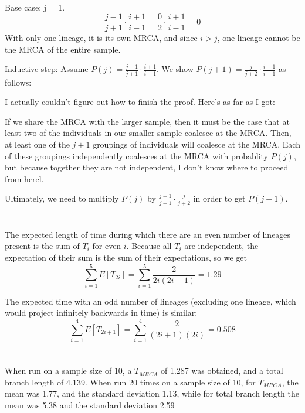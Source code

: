 \documentclass{article}
\begin{document}
\subsection{}
Base case:  j = 1.  $$\frac{j - 1}{j + 1} \cdot \frac{i + 1}{i - 1} =
                      \frac{0}{2} \cdot \frac{i + 1}{i - 1} = 0$$
With only one lineage, it is its own MRCA, and since $i > j$, one lineage cannot
be the MRCA of the entire sample.

Inductive step:
Assume $P(j) = \frac{j - 1}{j + 1} \cdot \frac{i + 1}{i - 1}$.  We show
$P(j+1) = \frac{j}{j + 2} \cdot \frac{i + 1}{i - 1}$ as follows:

I actually couldn't figure out how to finish the proof.  Here's as far as I got:

If we share the MRCA with the larger sample, then it must be the case that at
least two of the individuals in our smaller sample coalesce at the MRCA.  Then,
at least one of the $j+1$ groupings of individuals will coalesce at the MRCA.
Each of these groupings independently coalesces at the MRCA with probablity
$P(j)$, but because together they are not independent, I don't know where to
proceed from herel.

Ultimately, we need to multiply $P(j)$ by $\frac{j + 1}{j - 1} \cdot \frac{j}{j + 2}$ in
order to get $P(j+1)$.

\section{}
The expected length of time during which there are an even number of lineages
present is the sum of $T_i$ for even $i$.  Because all $T_i$ are independent,
the expectation of their sum is the sum of their expectations, so we get
$$\sum_{i=1}^5 E[T_{2i}] = \sum_{i=1}^5 \frac{2}{2i (2i - 1)} = 1.29 $$

The expected time with an odd number of lineages (excluding one lineage, which
would project infinitely backwards in time) is similar:
$$\sum_{i=1}^4 E[T_{2i+1}] = \sum_{i=1}^4 \frac{2}{(2i+1) (2i)} = 0.508 $$
\section{}
When run on a sample size of 10, a $T_{MRCA}$ of 1.287 was obtained, and a
total branch length of 4.139.  When run 20 times on a sample size of 10, for
$T_{MRCA}$, the mean was 1.77, and the standard deviation 1.13, while for
total branch length the mean was 5.38 and the standard deviation 2.59
\end{document}
